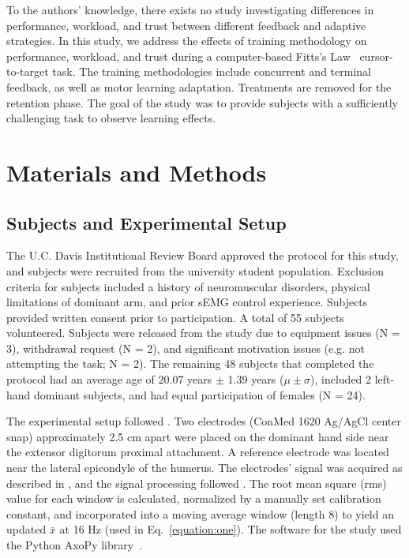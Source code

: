To the authors' knowledge, there exists no study investigating differences in performance, workload, and trust between different feedback and adaptive strategies.
In this study, we address the effects of training methodology on performance, workload, and trust during a computer-based Fitts's Law~\citep{RN43} cursor-to-target task.
The training methodologies include concurrent and terminal feedback, as well as motor learning adaptation.
Treatments are removed for the retention phase.
The goal of the study was to provide subjects with a sufficiently challenging task to observe learning effects.

\section{Materials and Methods}
\subsection{Subjects and Experimental Setup}

The U.C. Davis Institutional Review Board approved the protocol for this study, and subjects were recruited from the university student population.
Exclusion criteria for subjects included a history of neuromuscular disorders, physical limitations of dominant arm, and prior sEMG control experience.
Subjects provided written consent prior to participation.
A total of 55 subjects volunteered.
Subjects were released from the study due to equipment issues (N = 3), withdrawal request (N = 2), and significant motivation issues (e.g. not attempting the task; N = 2).
The remaining 48 subjects that completed the protocol had an average age of 20.07 years $\pm$ 1.39 years ($\mu\pm\sigma$), included 2 left-hand dominant subjects, and had equal participation of females (N = 24).

The experimental setup followed \citeauthor{RN44}.
Two electrodes (ConMed 1620 Ag/AgCl center snap) approximately 2.5 cm apart were placed on the dominant hand side near the extensor digitorum proximal attachment.
A reference electrode was located near the lateral epicondyle of the humerus.
The electrodes' signal was acquired as described in \citet{RN44}, and the signal processing followed \citet{RN45}.
The root mean square (rms) value for each window is calculated, normalized by a manually set calibration constant, and incorporated into a moving average window (length 8) to yield an updated $\bar{x}$ at 16 Hz (used in Eq.~\ref{equation:one}).
The software for the study used the Python AxoPy library~\citep{RN46}.

